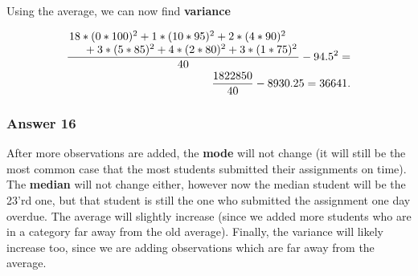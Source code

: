 \documentclass[11pt]{article}
\begin{document}
Using the average, we can now find \textbf{variance} 

\begin{equation*}
  \begin{aligned}
    \frac{\splitfrac{18 * (0 * 100)^2 + 1 * (10 * 95)^2 + 2 * (4 * 90)^2}
      {+ 3 * (5 * 85)^2 + 4 * (2 * 80)^2 + 3 * (1 * 75)^2}}{40} - 94.5^2 = \\
    \frac{1822850}{40} - 8930.25 = 36641.
  \end{aligned}
\end{equation*}
\subsubsection{Answer 16}
\label{sec-1-4-4}
After more observations are added, the \textbf{mode} will not change (it will still
be the most common case that the most students submitted their assignments on
time).  The \textbf{median} will not change either, however now the median student
will be the 23'rd one, but that student is still the one who submitted the
assignment one day overdue.  The average will slightly increase (since we
added more students who are in a category far away from the old average).
Finally, the variance will likely increase too, since we are adding observations
which are far away from the average.
\end{document}

